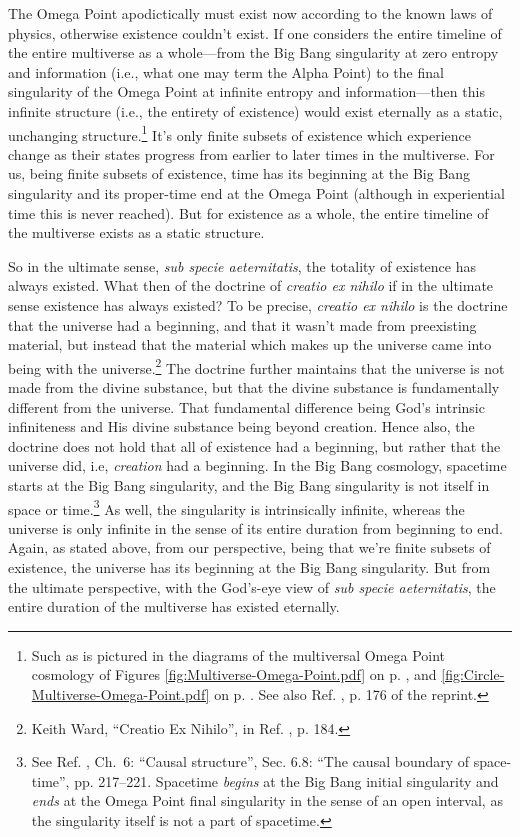 \documentclass[letterpaper,12pt]{article}
\begin{document}
The Omega Point apodictically must exist now according to the known laws of physics, otherwise existence couldn't exist. If one considers the entire timeline of the entire multiverse as a whole---from the Big Bang singularity at zero entropy and information (i.e., what one may term the Alpha Point) to the final singularity of the Omega Point at infinite entropy and information---then this infinite structure (i.e., the entirety of existence) would exist eternally as a static, unchanging structure.\footnote{Such as is pictured in the diagrams of the multiversal Omega Point cosmology of Figures \ref{fig:Multiverse-Omega-Point.pdf} on p. \pageref{fig:Multiverse-Omega-Point.pdf}, and \ref{fig:Circle-Multiverse-Omega-Point.pdf} on p. \pageref{fig:Circle-Multiverse-Omega-Point.pdf}. See also Ref. , p. 176 of the reprint.} It's only finite subsets of existence which experience change as their states progress from earlier to later times in the multiverse. For us, being finite subsets of existence, time has its beginning at the Big Bang singularity and its proper-time end at the Omega Point (although in experiential time this is never reached). But for existence as a whole, the entire timeline of the multiverse exists as a static structure.

So in the ultimate sense, \emph{sub specie aeternitatis}, the totality of existence has always existed. What then of the doctrine of \emph{creatio ex nihilo} if in the ultimate sense existence has always existed? To be precise, \emph{creatio ex nihilo} is the doctrine that the universe had a beginning, and that it wasn't made from preexisting material, but instead that the material which makes up the universe came into being with the universe.\footnote{Keith Ward, ``Creatio Ex Nihilo'', in Ref. , p. 184.} The doctrine further maintains that the universe is not made from the divine substance, but that the divine substance is fundamentally different from the universe. That fundamental difference being God's intrinsic infiniteness and His divine substance being beyond creation. Hence also, the doctrine does not hold that all of existence had a beginning, but rather that the universe did, i.e, \emph{creation} had a beginning. In the Big Bang cosmology, spacetime starts at the Big Bang singularity, and the Big Bang singularity is not itself in space or time.\footnote{See Ref. , Ch.~6: ``Causal structure'', Sec. 6.8: ``The causal boundary of space-time'', pp. 217--221. Spacetime \emph{begins} at the Big Bang initial singularity and \emph{ends} at the Omega Point final singularity in the sense of an open interval, as the singularity itself is not a part of spacetime.} As well, the singularity is intrinsically infinite, whereas the universe is only infinite in the sense of its entire duration from beginning to end. Again, as stated above, from our perspective, being that we're finite subsets of existence, the universe has its beginning at the Big Bang singularity. But from the ultimate perspective, with the God's-eye view of \emph{sub specie aeternitatis}, the entire duration of the multiverse has existed eternally.
\end{document}
